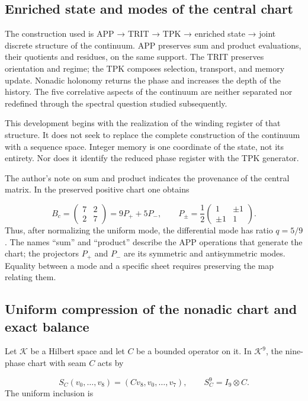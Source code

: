 \subsection{Enriched state and modes of the central chart}
\label{viii:tm-add-c1}
The construction used is APP → TRIT → TPK → enriched state → joint discrete structure of the continuum. APP preserves sum and product evaluations, their quotients and residues, on the same support. The TRIT preserves orientation and regime; the TPK composes selection, transport, and memory update. Nonadic holonomy returns the phase and increases the depth of the history. The five correlative aspects of the continuum are neither separated nor redefined through the spectral question studied subsequently.

This development begins with the realization of the winding register of that structure. It does not seek to replace the complete construction of the continuum with a sequence space. Integer memory is one coordinate of the state, not its entirety. Nor does it identify the reduced phase register with the TPK generator.

The author's note on sum and product indicates the provenance of the central matrix. In the preserved positive chart one obtains

\[
B_c=\begin{pmatrix}7&2\\2&7\end{pmatrix}
=9P_++5P_-,\qquad
P_\pm=\frac12\begin{pmatrix}1&\pm1\\\pm1&1\end{pmatrix}.
\]
Thus, after normalizing the uniform mode, the differential mode has ratio \(q=5/9\). The names “sum” and “product” describe the APP operations that generate the chart; the projectors \(P_+\) and \(P_-\) are its symmetric and antisymmetric modes. Equality between a mode and a specific sheet requires preserving the map relating them.


\subsection{Uniform compression of the nonadic chart and exact balance}
\label{viii:tm-add-c2}
Let \(\mathcal K\) be a Hilbert space and let \(C\) be a bounded operator on it. In \(\mathcal K^9\), the nine-phase chart with seam \(C\) acts by

\[
S_C(v_0,\ldots,v_8)=(Cv_8,v_0,\ldots,v_7),
\qquad S_C^9=I_9\otimes C.
\]
The uniform inclusion is


